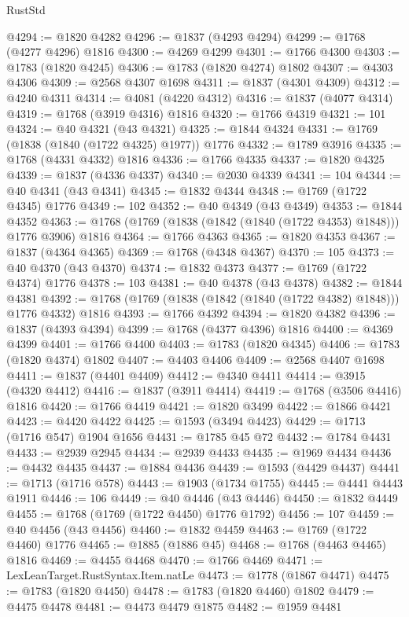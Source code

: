 \begin{lexlean}{RustStd}
\begin{coremodule}
{\begin{coremodule}
{{{{{{{{{{{{{{{{{{{{{{{{{{{{{{{{{{{{{{{{{{{{{{{@4294 := @1820 @4282
@4296 := @1837 (@4293 @4294)
@4299 := @1768 (@4277 @4296) @1816
@4300 := @4269 @4299
@4301 := @1766 @4300
@4303 := @1783 (@1820 @4245)
@4306 := @1783 (@1820 @4274) @1802
@4307 := @4303 @4306
@4309 := @2568 @4307 @1698
@4311 := @1837 (@4301 @4309)
@4312 := @4240 @4311
@4314 := @4081 (@4220 @4312)
@4316 := @1837 (@4077 @4314)
@4319 := @1768 (@3919 @4316) @1816
@4320 := @1766 @4319
@4321 := 101
@4324 := @40 @4321 (@43 @4321)
@4325 := @1844 @4324
@4331 := @1769 (@1838 (@1840 (@1722 @4325) @1977)) @1776
@4332 := @1789 @3916
@4335 := @1768 (@4331 @4332) @1816
@4336 := @1766 @4335
@4337 := @1820 @4325
@4339 := @1837 (@4336 @4337)
@4340 := @2030 @4339
@4341 := 104
@4344 := @40 @4341 (@43 @4341)
@4345 := @1832 @4344
@4348 := @1769 (@1722 @4345) @1776
@4349 := 102
@4352 := @40 @4349 (@43 @4349)
@4353 := @1844 @4352
@4363 := @1768 (@1769 (@1838 (@1842 (@1840 (@1722 @4353) @1848))) @1776 @3906) @1816
@4364 := @1766 @4363
@4365 := @1820 @4353
@4367 := @1837 (@4364 @4365)
@4369 := @1768 (@4348 @4367)
@4370 := 105
@4373 := @40 @4370 (@43 @4370)
@4374 := @1832 @4373
@4377 := @1769 (@1722 @4374) @1776
@4378 := 103
@4381 := @40 @4378 (@43 @4378)
@4382 := @1844 @4381
@4392 := @1768 (@1769 (@1838 (@1842 (@1840 (@1722 @4382) @1848))) @1776 @4332) @1816
@4393 := @1766 @4392
@4394 := @1820 @4382
@4396 := @1837 (@4393 @4394)
@4399 := @1768 (@4377 @4396) @1816
@4400 := @4369 @4399
@4401 := @1766 @4400
@4403 := @1783 (@1820 @4345)
@4406 := @1783 (@1820 @4374) @1802
@4407 := @4403 @4406
@4409 := @2568 @4407 @1698
@4411 := @1837 (@4401 @4409)
@4412 := @4340 @4411
@4414 := @3915 (@4320 @4412)
@4416 := @1837 (@3911 @4414)
@4419 := @1768 (@3506 @4416) @1816
@4420 := @1766 @4419
@4421 := @1820 @3499
@4422 := @1866 @4421
@4423 := @4420 @4422
@4425 := @1593 (@3494 @4423)
@4429 := @1713 (@1716 @547) @1904 @1656
@4431 := @1785 @45 @72
@4432 := @1784 @4431
@4433 := @2939 @2945
@4434 := @2939 @4433
@4435 := @1969 @4434
@4436 := @4432 @4435
@4437 := @1884 @4436
@4439 := @1593 (@4429 @4437)
@4441 := @1713 (@1716 @578)
@4443 := @1903 (@1734 @1755)
@4445 := @4441 @4443 @1911
@4446 := 106
@4449 := @40 @4446 (@43 @4446)
@4450 := @1832 @4449
@4455 := @1768 (@1769 (@1722 @4450) @1776 @1792)
@4456 := 107
@4459 := @40 @4456 (@43 @4456)
@4460 := @1832 @4459
@4463 := @1769 (@1722 @4460) @1776
@4465 := @1885 (@1886 @45)
@4468 := @1768 (@4463 @4465) @1816
@4469 := @4455 @4468
@4470 := @1766 @4469
@4471 := LexLeanTarget.RustSyntax.Item.natLe
@4473 := @1778 (@1867 @4471)
@4475 := @1783 (@1820 @4450)
@4478 := @1783 (@1820 @4460) @1802
@4479 := @4475 @4478
@4481 := @4473 @4479 @1875
@4482 := @1959 @4481
}}}}}}}}}}}}}}}}}}}}}}}}}}}}}}}}}}}}}}}}}}}}}}}
\end{coremodule}}
\end{coremodule}
\end{lexlean}

